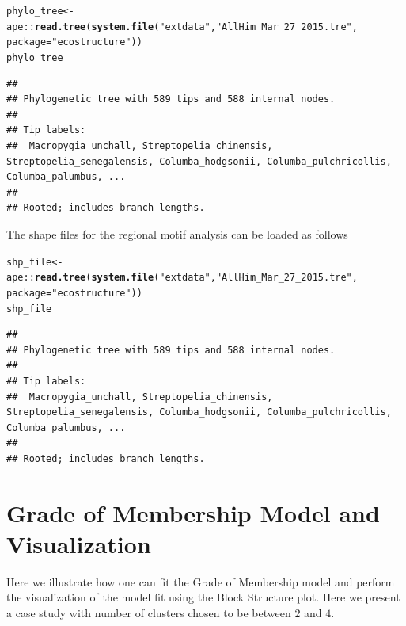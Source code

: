 \documentclass[12pt]{article}\usepackage[]{graphicx}\usepackage[usenames,dvipsnames]{color}
\makeatletter
\newcommand{\hlstr}[1]{\textcolor[rgb]{0.192,0.494,0.8}{#1}}%
\newcommand{\hlopt}[1]{\textcolor[rgb]{0,0,0}{#1}}%
\newcommand{\hlstd}[1]{\textcolor[rgb]{0.345,0.345,0.345}{#1}}%
\newcommand{\hlkwb}[1]{\textcolor[rgb]{0.69,0.353,0.396}{#1}}%
\newcommand{\hlkwc}[1]{\textcolor[rgb]{0.333,0.667,0.333}{#1}}%
\newcommand{\hlkwd}[1]{\textcolor[rgb]{0.737,0.353,0.396}{\textbf{#1}}}%
\newenvironment{kframe}{%
 \def\at@end@of@kframe{}%
 \ifinner\ifhmode%
  \def\at@end@of@kframe{\end{minipage}}%
  \begin{minipage}{\columnwidth}%
 \fi\fi%
 \def\FrameCommand##1{\hskip\@totalleftmargin \hskip-\fboxsep
 \colorbox{shadecolor}{##1}\hskip-\fboxsep
     \hskip-\linewidth \hskip-\@totalleftmargin \hskip\columnwidth}%
 \MakeFramed {\advance\hsize-\width
   \@totalleftmargin\z@ \linewidth\hsize
   \@setminipage}}%
 {\par\unskip\endMakeFramed%
 \at@end@of@kframe}
\newenvironment{knitrout}{}{} %
\makeatother
\begin{document}
\begin{knitrout}
\color{fgcolor}\begin{kframe}
\begin{alltt}
\hlstd{phylo_tree} \hlkwb{<-} \hlstd{ape}\hlopt{::}\hlkwd{read.tree}\hlstd{(}\hlkwd{system.file}\hlstd{(}\hlstr{"extdata"}\hlstd{,} \hlstr{"AllHim_Mar_27_2015.tre"}\hlstd{,}
                             \hlkwc{package} \hlstd{=} \hlstr{"ecostructure"}\hlstd{))}
\hlstd{phylo_tree}
\end{alltt}
\begin{verbatim}
## 
## Phylogenetic tree with 589 tips and 588 internal nodes.
## 
## Tip labels:
## 	Macropygia_unchall, Streptopelia_chinensis, Streptopelia_senegalensis, Columba_hodgsonii, Columba_pulchricollis, Columba_palumbus, ...
## 
## Rooted; includes branch lengths.
\end{verbatim}
\end{kframe}
\end{knitrout}


The shape files for the regional motif analysis can be loaded as follows

\begin{knitrout}
\color{fgcolor}\begin{kframe}
\begin{alltt}
\hlstd{shp_file} \hlkwb{<-} \hlstd{ape}\hlopt{::}\hlkwd{read.tree}\hlstd{(}\hlkwd{system.file}\hlstd{(}\hlstr{"extdata"}\hlstd{,} \hlstr{"AllHim_Mar_27_2015.tre"}\hlstd{,}
                             \hlkwc{package} \hlstd{=} \hlstr{"ecostructure"}\hlstd{))}
\hlstd{shp_file}
\end{alltt}
\begin{verbatim}
## 
## Phylogenetic tree with 589 tips and 588 internal nodes.
## 
## Tip labels:
## 	Macropygia_unchall, Streptopelia_chinensis, Streptopelia_senegalensis, Columba_hodgsonii, Columba_pulchricollis, Columba_palumbus, ...
## 
## Rooted; includes branch lengths.
\end{verbatim}
\end{kframe}
\end{knitrout}

\section{Grade of Membership Model and Visualization}

Here we illustrate how one can fit the Grade of Membership model and perform the visualization of the model fit using the Block Structure plot. Here we present a case study with number of clusters chosen to be between $2$ and $4$.
\end{document}
